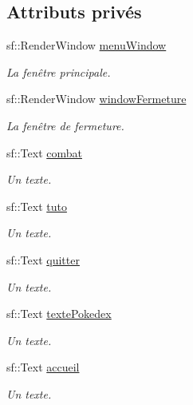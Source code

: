 \subsection*{Attributs privés}
\begin{DoxyCompactItemize}
\item 
sf\+::\+Render\+Window \hyperlink{class_s_f_m_l_menu_a6422047c4cfef4482c49515348e818b6}{menu\+Window}
\begin{DoxyCompactList}\small\item\em La fenêtre principale. \end{DoxyCompactList}\item 
sf\+::\+Render\+Window \hyperlink{class_s_f_m_l_menu_a72c2f09a8540f38ce460a16e9c6541ce}{window\+Fermeture}
\begin{DoxyCompactList}\small\item\em La fenêtre de fermeture. \end{DoxyCompactList}\item 
sf\+::\+Text \hyperlink{class_s_f_m_l_menu_a39c1b4490f17be2d3c367397d08df53e}{combat}
\begin{DoxyCompactList}\small\item\em Un texte. \end{DoxyCompactList}\item 
sf\+::\+Text \hyperlink{class_s_f_m_l_menu_a0e520837a05bb61f39d27507f85353d7}{tuto}
\begin{DoxyCompactList}\small\item\em Un texte. \end{DoxyCompactList}\item 
sf\+::\+Text \hyperlink{class_s_f_m_l_menu_aedb41cd07e45690aca5797cc867300dc}{quitter}
\begin{DoxyCompactList}\small\item\em Un texte. \end{DoxyCompactList}\item 
sf\+::\+Text \hyperlink{class_s_f_m_l_menu_a5f594b7ac0011830d3f46f0cc2000797}{texte\+Pokedex}
\begin{DoxyCompactList}\small\item\em Un texte. \end{DoxyCompactList}\item 
sf\+::\+Text \hyperlink{class_s_f_m_l_menu_ade3be9d73dc5eadcf78f93bd736637b3}{accueil}
\begin{DoxyCompactList}\small\item\em Un texte. \end{DoxyCompactList}\item 

\end{DoxyCompactItemize}
